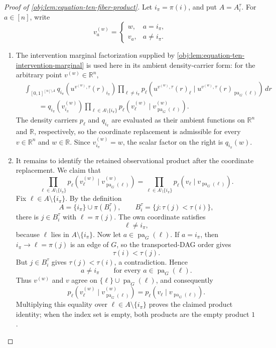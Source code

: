 \documentclass[11pt]{article}
\begin{document}
\begin{proof}[Proof of \cref{obj:lem:equation-ten-fiber-product}]
Let \(i_\pi=\pi(i)\), and put \(A=A_i^\tau\).  For \(a\in[n]\), write
\[
v^{(w)}_a=
\begin{cases}
w, & a=i_\pi,\\
v_a, & a\ne i_\pi .
\end{cases}
\]

\begin{enumerate}
\item The intervention marginal factorization supplied by \cref{obj:lem:equation-ten-intervention-marginal} is used here in its ambient density-carrier form: for the arbitrary point \(v^{(w)}\in\mathbb R^n\),
\[
\begin{aligned}
&\int_{[0,1]^{[n]\setminus A}}
q_{i_\pi}\!\left(u^{v^{(w)},\tau}(r)_{i_\pi}\right)
\prod_{\ell\ne i_\pi}
p_\ell\!\left(u^{v^{(w)},\tau}(r)_\ell\mid
u^{v^{(w)},\tau}(r)_{\operatorname{pa}_G(\ell)}\right)\,dr  \\
&\qquad =
q_{i_\pi}\!\left(v^{(w)}_{i_\pi}\right)
\prod_{\ell\in A\setminus\{i_\pi\}}
p_\ell\!\left(v^{(w)}_\ell\mid
v^{(w)}_{\operatorname{pa}_G(\ell)}\right).
\end{aligned}
\]
The density carriers \(p_\ell\) and \(q_{i_\pi}\) are evaluated as their ambient functions on \(\mathbb R^n\) and \(\mathbb R\), respectively, so the coordinate replacement is admissible for every \(v\in\mathbb R^n\) and \(w\in\mathbb R\).  Since \(v^{(w)}_{i_\pi}=w\), the scalar factor on the right is \(q_{i_\pi}(w)\). %

\item It remains to identify the retained observational product after the coordinate replacement.  We claim that
\[
\prod_{\ell\in A\setminus\{i_\pi\}}
p_\ell\!\left(v^{(w)}_\ell\mid
v^{(w)}_{\operatorname{pa}_G(\ell)}\right)
=
\prod_{\ell\in A\setminus\{i_\pi\}}
p_\ell\!\left(v_\ell\mid v_{\operatorname{pa}_G(\ell)}\right).
\]
Fix \(\ell\in A\setminus\{i_\pi\}\).  By the definition
\[
A=\{i_\pi\}\cup \pi(B_i^\tau),
\qquad
B_i^\tau=\{j:\tau(j)<\tau(i)\},
\]
there is \(j\in B_i^\tau\) with \(\ell=\pi(j)\).  The own coordinate satisfies
\[
\ell\ne i_\pi,
\]
because \(\ell\) lies in \(A\setminus\{i_\pi\}\).  Now let \(a\in\operatorname{pa}_G(\ell)\).  If \(a=i_\pi\), then \(i_\pi\to \ell=\pi(j)\) is an edge of \(G\), so the transported-DAG order gives
\[
\tau(i)<\tau(j).
\]
But \(j\in B_i^\tau\) gives \(\tau(j)<\tau(i)\), a contradiction.  Hence
\[
a\ne i_\pi
\qquad\text{for every }a\in\operatorname{pa}_G(\ell).
\]
Thus \(v^{(w)}\) and \(v\) agree on \(\{\ell\}\cup\operatorname{pa}_G(\ell)\), and consequently
\[
p_\ell\!\left(v^{(w)}_\ell\mid
v^{(w)}_{\operatorname{pa}_G(\ell)}\right)
=
p_\ell\!\left(v_\ell\mid v_{\operatorname{pa}_G(\ell)}\right).
\]
Multiplying this equality over \(\ell\in A\setminus\{i_\pi\}\) proves the claimed product identity; when the index set is empty, both products are the empty product \(1\). %


\end{enumerate}
\end{proof}
\end{document}
